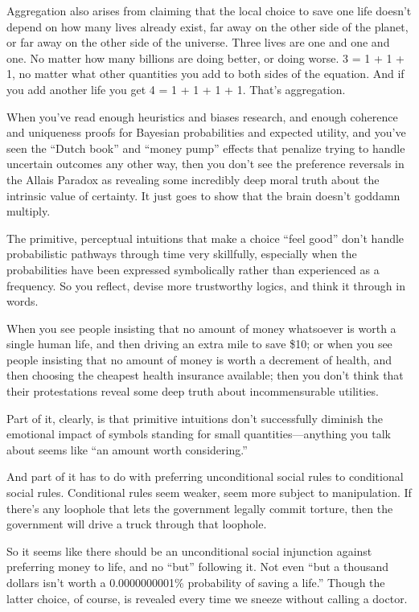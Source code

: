  Aggregation also arises from claiming that the local choice to
save one life doesn't depend on how many lives already
exist, far away on the other side of the planet, or far away on the
other side of the universe. Three lives are one and one and one. No
matter how many billions are doing better, or doing worse. 3 = 1 + 1 +
1, no matter what other quantities you add to both sides of the
equation. And if you add another life you get 4 = 1 + 1 + 1 + 1.
That's aggregation.


 When you've read enough heuristics and biases
research, and enough coherence and uniqueness proofs for Bayesian
probabilities and expected utility, and you've seen the
``Dutch book'' and
``money pump'' effects that penalize
trying to handle uncertain outcomes any other way, then you
don't see the preference reversals in the Allais
Paradox as revealing some incredibly deep moral truth about the
intrinsic value of certainty. It just goes to show that the brain
doesn't goddamn multiply.


 The primitive, perceptual intuitions that make a choice
``feel good'' don't
handle probabilistic pathways through time very skillfully, especially
when the probabilities have been expressed symbolically rather than
experienced as a frequency. So you reflect, devise more trustworthy
logics, and think it through in words.


 When you see people insisting that no amount of money whatsoever
is worth a single human life, and then driving an extra mile to save
\$10; or when you see people insisting that no amount of money is worth
a decrement of health, and then choosing the cheapest health insurance
available; then you don't think that their
protestations reveal some deep truth about incommensurable utilities.


 Part of it, clearly, is that primitive intuitions
don't successfully diminish the emotional impact of
symbols standing for small quantities---anything you talk about seems
like ``an amount worth
considering.''


 And part of it has to do with preferring unconditional social
rules to conditional social rules. Conditional rules seem weaker, seem
more subject to manipulation. If there's any loophole
that lets the government legally commit torture, then the government
will drive a truck through that loophole.


 So it seems like there should be an unconditional social
injunction against preferring money to life, and no
``but'' following it. Not even
``but a thousand dollars isn't worth a
0.0000000001\% probability of saving a life.'' Though
the latter choice, of course, is revealed every time we sneeze without
calling a doctor.


